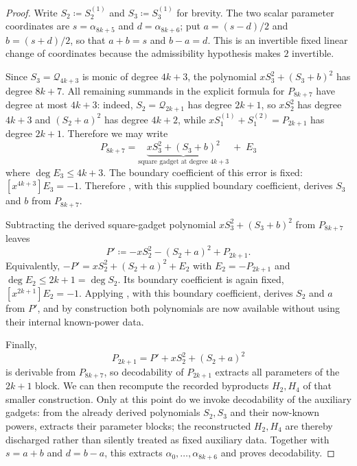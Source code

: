 \begin{proof}
    Write $S_2\coloneqq S^{(1)}_2$ and
    $S_3\coloneqq S^{(1)}_3$ for brevity.  The two scalar parameter
    coordinates are $s=\alpha_{8k+5}$ and $d=\alpha_{8k+6}$; put
    $a=(s-d)/2$ and $b=(s+d)/2$, so that $a+b=s$ and $b-a=d$.
    This is an invertible fixed linear change of coordinates because the
    admissibility hypothesis makes $2$ invertible.

    Since $S_3=\mathcal Q_{4k+3}$ is monic of degree $4k+3$, the polynomial $xS_3^2+(S_3+b)^2$ has degree $8k+7$.
    All remaining summands in the explicit formula for $P_{8k+7}$ have degree at most $4k+3$:
    indeed, $S_2=\mathcal Q_{2k+1}$ has degree $2k+1$, so $xS_2^2$ has degree $4k+3$ and $(S_2+a)^2$ has degree $4k+2$, while $xS^{(1)}_1+S^{(2)}_1=P_{2k+1}$ has degree $2k+1$.
    Therefore we may write
    \[
        P_{8k+7} = \underbrace{xS_3^2 + (S_3+b)^2}_{\text{square gadget at degree }4k+3}
            \;+\; E_3
    \]
    where $\deg E_3\le 4k+3$.
    The boundary coefficient of this error is fixed:
    $[x^{4k+3}]E_3=-1$.  Therefore
    , with this supplied boundary
    coefficient, derives $S_3$ and $b$ from $P_{8k+7}$.

    Subtracting the derived square-gadget polynomial $xS_3^2+(S_3+b)^2$ from $P_{8k+7}$ leaves
    \[
        P' \coloneqq -xS_2^2 - (S_2+a)^2 + P_{2k+1}.
    \]
    Equivalently, $-P' = xS_2^2 + (S_2+a)^2 + E_2$ with $E_2=-P_{2k+1}$ and $\deg E_2\le 2k+1=\deg S_2$.
    Its boundary coefficient is again fixed, $[x^{2k+1}]E_2=-1$.
    Applying , with this boundary
    coefficient, derives $S_2$ and $a$ from $P'$, and by
    construction both polynomials are now available without using their
    internal known-power data.

    Finally,
    \[
        P_{2k+1} = P' + xS_2^2 + (S_2+a)^2
    \]
    is derivable from $P_{8k+7}$, so decodability of $P_{2k+1}$ extracts all
    parameters of the $2k+1$ block.  We can then recompute the recorded
    byproducts $H_2,H_4$ of that smaller construction.  Only at this point do
    we invoke decodability of the auxiliary gadgets: from the already derived
    polynomials $S_2,S_3$ and their now-known powers,
     extracts their parameter blocks;
    the reconstructed $H_2,H_4$ are thereby discharged rather than silently
    treated as fixed auxiliary data.
    Together with $s=a+b$ and $d=b-a$, this extracts
    $\alpha_0,\ldots,\alpha_{8k+6}$ and proves decodability.


\end{proof}
